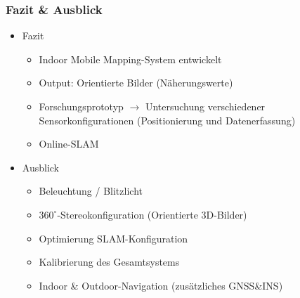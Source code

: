 \documentclass[aspectratio=169]{beamer}
\begin{document}
\begin{frame}
\frametitle{Fazit \& Ausblick}
  \begin{itemize}
   \item Fazit
   \begin{itemize}
    \item Indoor Mobile Mapping-System entwickelt
    \item Output: Orientierte Bilder (Näherungswerte)
    \pause
    \item Forschungsprototyp $\rightarrow$ Untersuchung verschiedener Sensorkonfigurationen (Positionierung und Datenerfassung)
    \pause
    \item Online-SLAM
   \end{itemize}
   \pause
   \item Ausblick
   \begin{itemize}
    \item Beleuchtung / Blitzlicht
    \pause
    \item $360^\circ$-Stereokonfiguration (Orientierte 3D-Bilder)
    \pause
    \item Optimierung SLAM-Konfiguration
    \item Kalibrierung des Gesamtsystems
    \pause
    \item Indoor \& Outdoor-Navigation (zusätzliches GNSS\&INS)
   \end{itemize}
  \end{itemize}
\end{frame}
\end{document}
